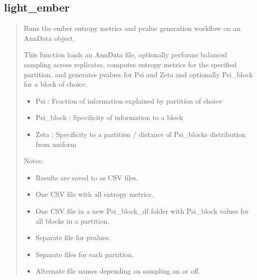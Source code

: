 \documentclass[letterpaper,10pt,english]{sphinxmanual}
\begin{document}
\subsection{light\_ember}
\label{\detokenize{cli:light_ember}}\begin{quote}

\sphinxAtStartPar
Runs the ember entropy metrics and p\sphinxhyphen{}value generation workflow on an AnnData object.

\sphinxAtStartPar
This function loads an AnnData  file, optionally performs balanced sampling
across replicates, computes entropy metrics for the specified partition,
and generates p\sphinxhyphen{}values for Psi and Zeta and optionally Psi\_block for a block of choice.
\begin{description}
\begin{itemize}
\item {} 
\sphinxAtStartPar
Psi : Fraction of information explained by partition of choice

\item {} 
\sphinxAtStartPar
Psi\_block : Specificity of information to a block

\item {} 
\sphinxAtStartPar
Zeta : Specificity to a partition / distance of Psi\_blocks distribution from uniform

\end{itemize}

\end{description}

\sphinxAtStartPar
Notes:
\begin{itemize}
\item {} 
\sphinxAtStartPar
Results are saved to  as CSV files.

\item {} 
\sphinxAtStartPar
One CSV file with all entropy metrics.

\item {} 
\sphinxAtStartPar
One CSV file in a new Psi\_block\_df folder with Psi\_block values for all blocks in a partition.

\item {} 
\sphinxAtStartPar
Separate file for p\sphinxhyphen{}values.

\item {} 
\sphinxAtStartPar
Separate files for each partition.

\item {} 
\sphinxAtStartPar
Alternate file names depending on sampling on or off.

\end{itemize}
\end{quote}
\end{document}
